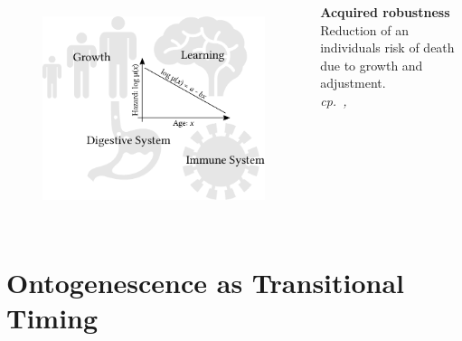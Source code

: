 \documentclass{beamer}
\begin{document}
\begin{frame}
\frametitle{\insertsection}

\begin{columns}[c]

\begin{figure}[htb!]
\includegraphics[width = \textwidth]{./fig/acquired_robustness.pdf}\\
\end{figure}

\footnotesize\textbf{Acquired robustness}\\
Reduction of an individuals risk of death due to growth and adjustment.\\
\scriptsize\emph{cp.~\textcite{Levitis2011}, \textcite{Siler1979}}

\end{columns}

\end{frame}

\section{Ontogenescence as Transitional Timing} %
\end{document}
